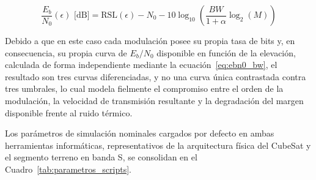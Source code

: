 \begin{equation}
    \frac{E_b}{N_0}(\epsilon) \text{ [dB]} = \text{RSL}(\epsilon) - N_0 - 10\log_{10}\left(\frac{BW}{1+\alpha}\log_{2}(M)\right)
    \label{eq:ebn0_bw}
\end{equation}

Debido a que en este caso cada modulación posee su propia tasa de bits y, en consecuencia, su propia curva de $E_b/N_0$ disponible en función de la elevación, calculada de forma independiente mediante la ecuación~\eqref{eq:ebn0_bw}, el resultado son tres curvas diferenciadas, y no una curva única contrastada contra tres umbrales, lo cual modela fielmente el compromiso entre el orden de la modulación, la velocidad de transmisión resultante y la degradación del margen disponible frente al ruido térmico.

Los parámetros de simulación nominales cargados por defecto en ambas herramientas informáticas, representativos de la arquitectura física del CubeSat y el segmento terreno en banda S, se consolidan en el Cuadro~\ref{tab:parametros_scripts}.

